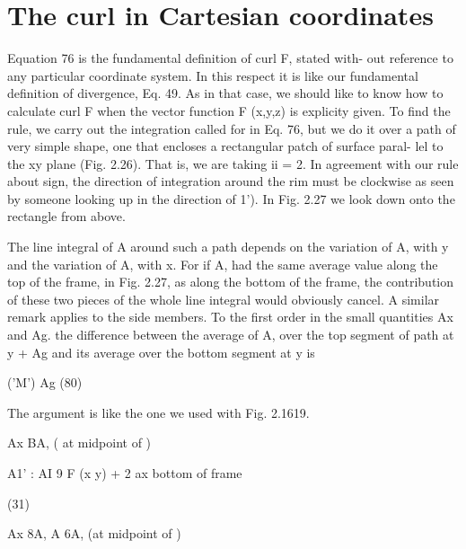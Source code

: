 \section{The curl in Cartesian coordinates}

Equation 76 is the fundamental definition of curl F, stated with-
out reference to any particular coordinate system. In this respect it
is like our fundamental definition of divergence, Eq. 49. As in that
case, we should like to know how to calculate curl F when the vector
function F (x,y,z) is explicity given. To find the rule, we carry out
the integration called for in Eq. 76, but we do it over a path of very
simple shape, one that encloses a rectangular patch of surface paral-
lel to the xy plane (Fig. 2.26). That is, we are taking ii = 2. In
agreement with our rule about sign, the direction of integration
around the rim must be clockwise as seen by someone looking up
in the direction of 1'). In Fig. 2.27 we look down onto the rectangle
from above.

The line integral of A around such a path depends on the variation
of A, with y and the variation of A, with x. For if A, had the same
average value along the top of the frame, in Fig. 2.27, as along the
bottom of the frame, the contribution of these two pieces of the whole
line integral would obviously cancel. A similar remark applies to
the side members. To the first order in the small quantities Ax and
Ag. the difference between the average of A, over the top segment of
path at y + Ag and its average over the bottom segment at y is

('M') Ag (80)

The argument is like the one we used with Fig. 2.1619.

Ax BA, ( at midpoint of )

A1' : AI 9 F
(x y) + 2 ax bottom of frame

(31)

Ax 8A, A 6A, (at midpoint of )

